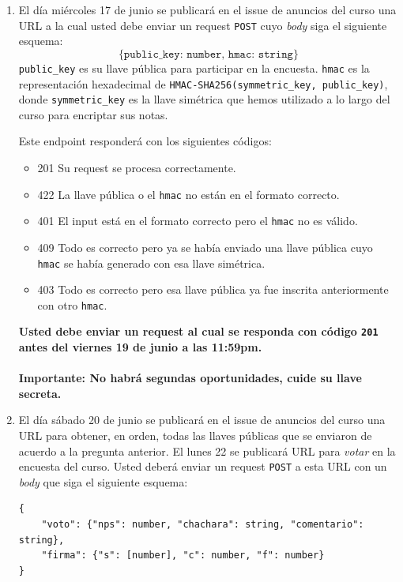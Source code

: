 \begin{enumerate}
\item \text{[0.5 puntos]} El día miércoles 17 de junio se publicará en el issue de anuncios del curso una URL a la cual usted debe enviar un request \texttt{POST} cuyo \emph{body} siga el siguiente esquema:
$$\texttt{\{public\_key: number, hmac: string\}}$$
\texttt{public\_key} es su llave pública para participar en la encuesta. \texttt{hmac} es la representación hexadecimal de \texttt{HMAC-SHA256(symmetric\_key, public\_key)}, donde \texttt{symmetric\_key} es la llave simétrica que hemos utilizado a lo largo del curso para encriptar sus notas.

Este endpoint responderá con los siguientes códigos:
\begin{itemize}
	\item 201 Su request se procesa correctamente.
	\item 422 La llave pública o el \texttt{hmac} no están en el formato correcto.
	\item 401 El input está en el formato correcto pero el \texttt{hmac} no es válido.
	\item 409 Todo es correcto pero ya se había enviado una llave pública cuyo \texttt{hmac} se había generado con esa llave simétrica.
	\item 403 Todo es correcto pero esa llave pública ya fue inscrita anteriormente con otro \texttt{hmac}.
\end{itemize}

\textbf{Usted debe enviar un request al cual se responda con código \texttt{201} antes del viernes 19 de junio a las 11:59pm.}
\\
\\
\textbf{Importante: No habrá segundas oportunidades, cuide su llave secreta.}

\item \text{[0.5 puntos]} El día sábado 20 de junio se publicará en el issue de anuncios del curso una URL para obtener, en orden, todas las llaves públicas que se enviaron de acuerdo a la pregunta anterior. El lunes 22 se publicará URL para \emph{votar} en la encuesta del curso. Usted deberá enviar un request \texttt{POST} a esta URL con un \emph{body} que siga el siguiente esquema:
\begin{verbatim}
{
    "voto": {"nps": number, "chachara": string, "comentario": string},
    "firma": {"s": [number], "c": number, "f": number}
}
\end{verbatim}


\end{enumerate}
